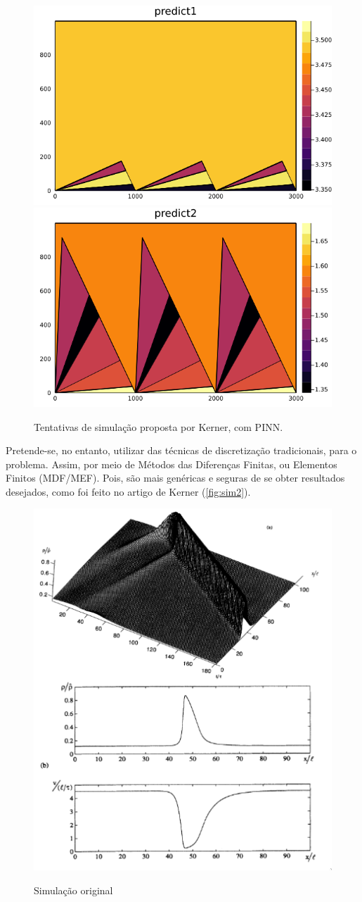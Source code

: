 \documentclass[12pt, brazilian]{article}
\begin{document}
\begin{figure}[ht]
  \centering
  \caption{\label{fig:sim1} Tentativas de simulação proposta por Kerner, com PINN.}
  \includegraphics[width=0.45\linewidth]{../img/sol_variable_corrected_bcs31.png}
  \includegraphics[width=0.45\linewidth]{../img/sol_variable_corrected_bcs32.png}
  \\
\end{figure}

Pretende-se, no entanto, utilizar das técnicas de discretização tradicionais, para o problema. Assim, por meio de Métodos das Diferenças Finitas, ou Elementos Finitos (MDF/MEF). Pois, são mais genéricas e seguras de se obter resultados desejados, como foi feito no artigo de Kerner (\autoref{fig:sim2}).

\begin{figure}[ht]
  \centering
  \caption{\label{fig:sim2} Simulação original}
  \includegraphics[width=0.4\linewidth]{./kerner.png}
  \\
\end{figure}


\clearpage


\end{document}
